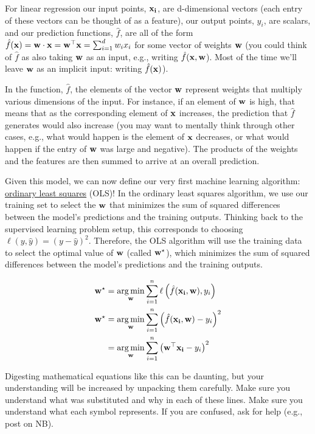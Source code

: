 \documentclass[assignment01_Solutions]{subfiles}
\begin{document}
For linear regression our input points, $\mathbf{x_i}$, are d-dimensional vectors (each entry of these vectors can be thought of as a feature), our output points, $y_i$, are scalars, and our prediction functions, $\hat{f}$, are all of the form $\hat{f}(\mathbf{x}) =\mathbf{w} \cdot \mathbf{x} = \mathbf{w}^\top \mathbf{x} = \sum_{i=1}^d w_i x_i$ for some vector of weights $\mathbf{w}$ (you could think of $\hat{f}$ as also taking $\mathbf{w}$ as an input, e.g., writing $\hat{f}(\mathbf{x}, \mathbf{w}$).  Most of the time we'll leave $\mathbf{w}$ as an implicit input: writing $\hat{f}(\mathbf{x})$).

In the function, $\hat{f}$, the elements of the vector $\mathbf{w}$ represent weights that multiply various dimensions of the input.  For instance, if an element of $\mathbf{w}$ is high, that means that as the corresponding element of $\mathbf{x}$ increases, the prediction that $\hat{f}$ generates would also increase (you may want to mentally think through other cases, e.g., what would happen is the element of $\mathbf{x}$ decreases, or what would happen if the entry of $\mathbf{w}$ was large and negative).  The products of the weights and the features are then summed to arrive at an overall prediction.

Given this model, we can now define our very first machine learning algorithm: \href{https://en.wikipedia.org/wiki/Ordinary_least_squares}{ordinary least squares} (OLS)!  In the ordinary least squares algorithm, we use our training set to select the $\mathbf{w}$ that minimizes the sum of squared differences between the model's predictions and the training outputs.  Thinking back to the supervised learning problem setup, this corresponds to choosing $\ell(y, \hat{y}) = (y - \hat{y})^2$.
Therefore, the OLS algorithm will use the training data to select the optimal value of $\mathbf{w}$ (called $\mathbf{w}^\star$), which minimizes the sum of squared differences between the model's predictions and the training outputs.

\begin{align}
\mathbf{w}^\star &= \operatorname*{arg\,min}_{\mathbf{w}} \sum_{i=1}^n \ell \left ( \hat{f}(\mathbf{x_i}, \mathbf{w}) , y_i \right) \\
\mathbf{w}^\star &= \operatorname*{arg\,min}_{\mathbf{w}} \sum_{i=1}^n \left ( \hat{f}(\mathbf{x_i}, \mathbf{w}) - y_i \right)^2 \\
&= \operatorname*{arg\,min}_{\mathbf{w}} \sum_{i=1}^n \left ( \mathbf{w}^\top \mathbf{x_i} - y_i \right)^2
\end{align}

\begin{notice}
Digesting mathematical equations like this can be daunting, but your understanding will be increased by unpacking them carefully.  Make sure you understand what was substituted and why in each of these lines.  Make sure you understand what each symbol represents.  If you are confused, ask for help (e.g., post on NB).
\end{notice}
\end{document}
